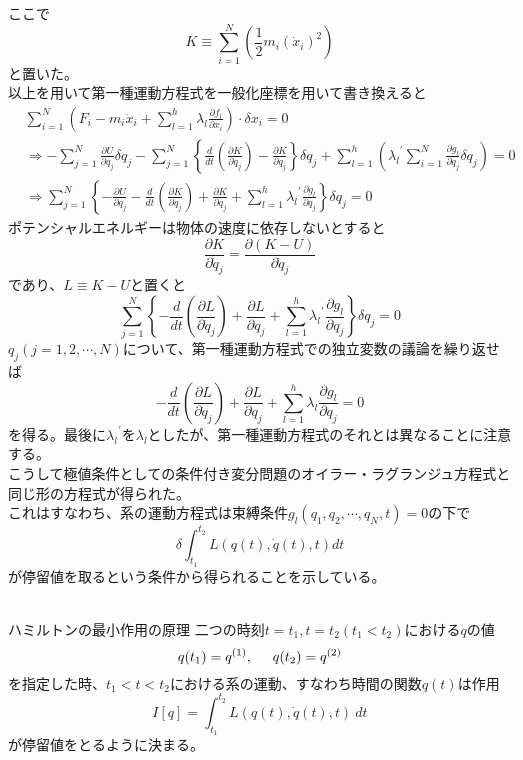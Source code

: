\documentclass{jsarticle}
\begin{document}
ここで
\[K\equiv\sum_{i=1}^{N}\left(\frac{1}{2}m_{i}(\dot{x}_{i})^{2}\right)\]
と置いた。\\
以上を用いて第一種運動方程式を一般化座標を用いて書き換えると
\begin{align*}
&\sum_{i=1}^{N}\left(F_{i}-m_{i}\ddot{x}_{i}+\sum_{l=1}^{h}\lambda_{l}\frac{\partial f_{l}}{\partial x_{i}}\right)\cdot\delta x_{i}=0\\
&\Longrightarrow-\sum_{j=1}^{N}\frac{\partial U}{\partial q_{j}}\delta q_{j}-\sum_{j=1}^{N}\left\{\frac{d}{dt}\left(\frac{\partial K}{\partial\dot{q}_{j}}\right)-\frac{\partial K}{\partial q_{j}}\right\}\delta q_{j}+\sum_{l=1}^{h}\left({\lambda_{l}}^{\prime}\sum_{i=1}^{N}\frac{\partial g_{l}}{\partial q_{j}}\delta q_{j}\right)=0\\
&\Longrightarrow\sum_{j=1}^{N}\left\{-\frac{\partial U}{\partial q_{j}}-\frac{d}{dt}\left(\frac{\partial K}{\partial\dot{q}_{j}}\right)+\frac{\partial K}{\partial q_{j}}+\sum_{l=1}^{h}{\lambda_{l}}^{\prime}\frac{\partial g_{l}}{\partial q_{j}}\right\}\delta q_{j}=0
\end{align*}
ポテンシャルエネルギーは物体の速度に依存しないとすると
\[\frac{\partial K}{\partial\dot{q}_{j}}=\frac{\partial(K-U)}{\partial\dot{q}_{j}}\]
であり、\(L\equiv K-U\)と置くと
\[\sum_{j=1}^{N}\left\{-\frac{d}{dt}\left(\frac{\partial L}{\partial\dot{q}_{j}}\right)+\frac{\partial L}{\partial q_{j}}+\sum_{l=1}^{h}{\lambda_{l}}^{\prime}\frac{\partial g_{l}}{\partial q_{j}}\right\}\delta q_{j}=0\]
\(q_{j}(j=1,2,\cdots,N)\)について、第一種運動方程式での独立変数の議論を繰り返せば
\[-\frac{d}{dt}\left(\frac{\partial L}{\partial\dot{q}_{j}}\right)+\frac{\partial L}{\partial q_{j}}+\sum_{l=1}^{h}\lambda_{l}\frac{\partial g_{l}}{\partial q_{j}}=0\]
を得る。最後に\({\lambda_{l}}^{\prime}\)を\(\lambda_{l}\)としたが、第一種運動方程式のそれとは異なることに注意する。\\
こうして極値条件としての条件付き変分問題のオイラー・ラグランジュ方程式と同じ形の方程式が得られた。\\
これはすなわち、系の運動方程式は束縛条件\(g_{l}(q_{1},q_{2},\cdots,q_{N},t)=0\)の下で
\[\delta\int_{t_{1}}^{t_{2}}L(q(t),\dot{q}(t),t)dt\]
が停留値を取るという条件から得られることを示している。\\
\\
\begin{itembox}[l]{ハミルトンの最小作用の原理}
二つの時刻\(t=t_{1},t=t_{2}(t_{1}<t_{2})\)における\(q\)の値
\[q(t_{1})=q^{(1)},\hspace{5mm}q(t_{2})=q^{(2)}\]
を指定した時、\(t_{1}<t<t_{2}\)における系の運動、すなわち時間の関数\(q(t)\)は作用
\[I[q]=\int_{t_{1}}^{t_{2}}L(q(t),\dot{q}(t),t)~dt\]
が停留値をとるように決まる。
\end{itembox}
\end{document}
